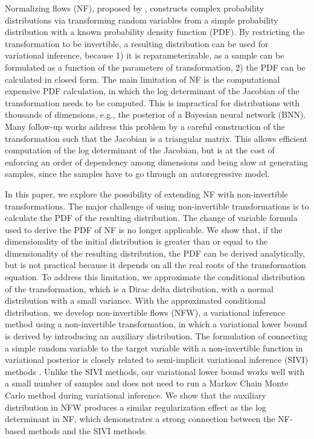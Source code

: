 \documentclass{article}
\newcommand{\acr}[1]{\textsc{#1}\xspace}
\newcommand{\us}{\acr{NFW}}
\begin{document}
Normalizing flows (NF), proposed by \cite{JimenezRezendeMohamed2015}, constructs complex probability distributions via transforming random variables from a simple probability distribution with a known probability density function (PDF). By restricting the transformation to be invertible, a resulting distribution can be used for variational inference, because 1) it is reparameterizable, as a sample can be formulated as a function of the parameters of transformation, 2) the PDF can be calculated in closed form. The main limitation of NF is the computational expensive PDF calculation, in which the log determinant of the Jacobian of the transformation needs to be computed. This is impractical for distributions with thousands of dimensions, e.g., the posterior of a  Bayesian neural network (BNN). Many follow-up works \citep{KingmaEtAl2016, DinhEtAl2017, HuangEtAl2018} address this problem by a careful construction of the transformation such that the Jacobian is a triangular matrix. This allows efficient computation of the log determinant of the Jacobian, but is at the cost of enforcing an order of dependency among dimensions and being slow at generating samples, since the samples have to go through an autoregressive model.

In this paper, we explore the possibility of extending NF with non-invertible transformations. The major challenge of using non-invertible transformations is to calculate the PDF of the resulting distribution. The change of variable formula used to derive the PDF of NF is no longer applicable. We show that, if the dimensionality of the initial distribution is greater than or equal to the dimensionality of the resulting distribution, the PDF can be derived analytically, but is not practical because it depends on all the real roots of the transformation equation. To address this limitation, we approximate the conditional distribution of the transformation, which is a Dirac delta distribution, with a normal distribution with a small variance. With the approximated conditional distribution, we develop non-invertible flows (\us),  a variational inference method using a non-invertible transformation, in which a variational lower bound is derived by introducing an auxiliary distribution. The formulation of connecting a simple random variable to the target variable with a non-invertible function in variational posterior is closely related to semi-implicit variational inference (SIVI) methods \citep{YinZhou2018, TitsiasRuiz2019, MolchanovEtAl2019}. Unlike the SIVI methods, our variational lower bound works well with a small number of samples and does not need to run a Markov Chain Monte Carlo method during variational inference. We show that the auxiliary distribution in \us produces a similar regularization effect as the log determinant in NF, which demonstrates a strong connection between the NF-based methods and the SIVI methods. 
\end{document}
